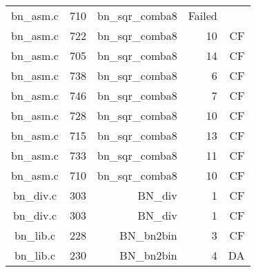 \begin{table}[h]
{\begin{tabular}{clrrr}
bn\_asm.c&710&bn\_sqr\_comba8&Failed&\\
bn\_asm.c&722&bn\_sqr\_comba8&10&CF\\
bn\_asm.c&705&bn\_sqr\_comba8&14&CF\\
bn\_asm.c&738&bn\_sqr\_comba8&6 &CF\\
bn\_asm.c&746&bn\_sqr\_comba8&7 &CF\\
bn\_asm.c&728&bn\_sqr\_comba8&10&CF\\
bn\_asm.c&715&bn\_sqr\_comba8&13&CF\\
bn\_asm.c&733&bn\_sqr\_comba8&11&CF\\
bn\_asm.c&710&bn\_sqr\_comba8&10&CF\\
bn\_div.c&303&BN\_div&1 &CF\\
bn\_div.c&303&BN\_div&1 &CF\\
bn\_lib.c&228&BN\_bn2bin&3 &CF\\
bn\_lib.c&230&BN\_bn2bin&4 &DA\\
\hline
\end{tabular}
}
\end{table}